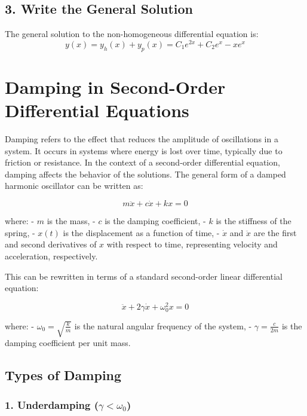 \documentclass[a4paper,12pt]{article}
\begin{document}
\subsection*{3. Write the General Solution}

The general solution to the non-homogeneous differential equation is:
\[
y(x) = y_h(x) + y_p(x) = C_1 e^{2x} + C_2 e^{x} - x e^x
\]


\section*{Damping in Second-Order Differential Equations}

Damping refers to the effect that reduces the amplitude of oscillations in a system. It occurs in systems where energy is lost over time, typically due to friction or resistance. In the context of a second-order differential equation, damping affects the behavior of the solutions. The general form of a damped harmonic oscillator can be written as:

\[ m \ddot{x} + c \dot{x} + k x = 0 \]

where:
- \( m \) is the mass,
- \( c \) is the damping coefficient,
- \( k \) is the stiffness of the spring,
- \( x(t) \) is the displacement as a function of time,
- \( \dot{x} \) and \( \ddot{x} \) are the first and second derivatives of \( x \) with respect to time, representing velocity and acceleration, respectively.

This can be rewritten in terms of a standard second-order linear differential equation:

\[ \ddot{x} + 2 \gamma \dot{x} + \omega_0^2 x = 0 \]

where:
- \( \omega_0 = \sqrt{\frac{k}{m}} \) is the natural angular frequency of the system,
- \( \gamma = \frac{c}{2m} \) is the damping coefficient per unit mass.

\subsection*{Types of Damping}

\subsubsection*{1. Underdamping (\( \gamma < \omega_0 \))}
\end{document}
